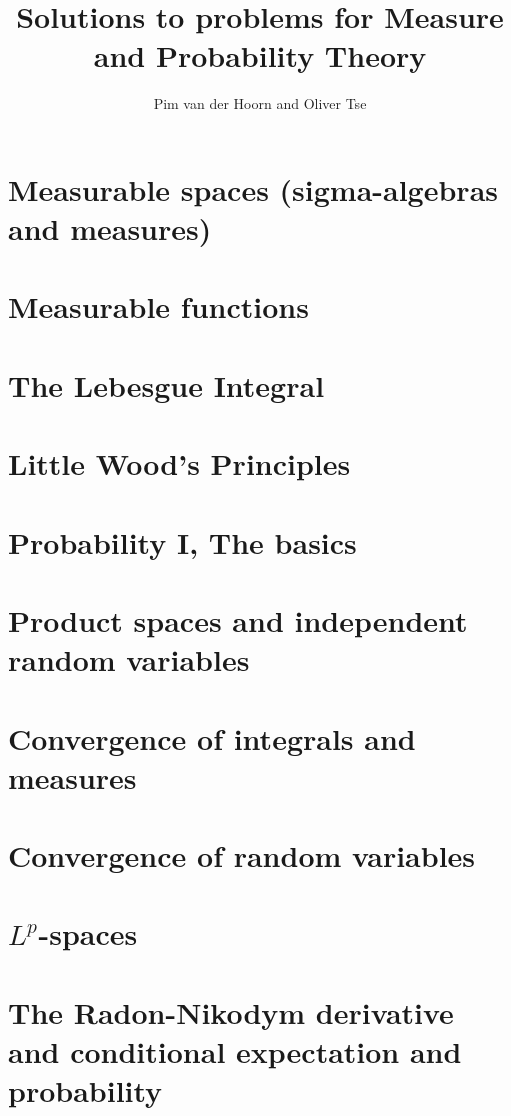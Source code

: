 \documentclass{lecturenotes}
\begin{document}
\begin{titlepage}
    \title{Solutions to problems for Measure and Probability Theory}
    \author{Pim van der Hoorn and Oliver Tse}
    \maketitle
\end{titlepage}

\setcounter{chapter}{1}

\chapter{Measurable spaces (sigma-algebras and measures)}


\newpage
\chapter{Measurable functions}


\newpage
\chapter{The Lebesgue Integral}


\newpage
\chapter{Little Wood's Principles}


\newpage
\chapter{Probability I, The basics}


\newpage
\chapter{Product spaces and independent random variables}


\newpage
\chapter{Convergence of integrals and measures}


\newpage
\chapter{Convergence of random variables}


\newpage
\chapter{$L^p$-spaces}


\newpage
\chapter{The Radon-Nikodym derivative and conditional expectation and probability}

\end{document}
